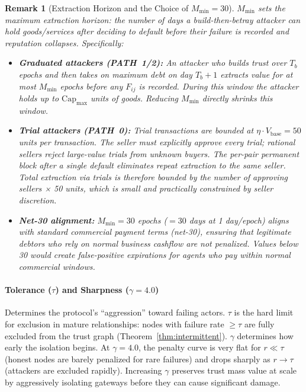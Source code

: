 \documentclass[11pt]{article}
\newtheorem{remark}[theorem]{Remark}
\begin{document}
\begin{remark}[Extraction Horizon and the Choice of $M_{\min} = 30$]\label{rem:extraction_horizon}
$M_{\min}$ sets the maximum \emph{extraction horizon}: the number of days a build-then-betray attacker can hold goods/services after deciding to default before their failure is recorded and reputation collapses. Specifically:
\begin{itemize}
    \item \textbf{Graduated attackers (PATH~1/2):} An attacker who builds trust over $T_b$ epochs and then takes on maximum debt on day $T_b + 1$ extracts value for at most $M_{\min}$ epochs before any $F_{ij}$ is recorded. During this window the attacker holds up to $\text{Cap}_{\max}$ units of goods. Reducing $M_{\min}$ directly shrinks this window.
    \item \textbf{Trial attackers (PATH~0):} Trial transactions are bounded at $\eta \cdot V_{\text{base}} = 50$ units per transaction. The seller must explicitly approve every trial; rational sellers reject large-value trials from unknown buyers. The per-pair permanent block after a single default eliminates repeat extraction to the same seller. Total extraction via trials is therefore bounded by the number of approving sellers × 50 units, which is small and practically constrained by seller discretion.
    \item \textbf{Net-30 alignment:} $M_{\min} = 30$ epochs ($= 30$ days at 1 day/epoch) aligns with standard commercial payment terms (net-30), ensuring that legitimate debtors who rely on normal business cashflow are not penalized. Values below 30 would create false-positive expirations for agents who pay within normal commercial windows.
\end{itemize}
\end{remark}

\paragraph{Tolerance ($\tau$) and Sharpness ($\gamma = 4.0$)}
Determines the protocol's ``aggression'' toward failing actors. $\tau$ is the hard limit for exclusion in mature relationships: nodes with failure rate $\geq \tau$ are fully excluded from the trust graph (Theorem~\ref{thm:intermittent}). $\gamma$ determines how early the isolation begins. At $\gamma = 4.0$, the penalty curve is very flat for $r \ll \tau$ (honest nodes are barely penalized for rare failures) and drops sharply as $r \to \tau$ (attackers are excluded rapidly). Increasing $\gamma$ preserves trust mass value at scale by aggressively isolating gateways before they can cause significant damage.
\end{document}
